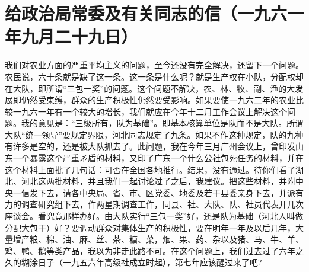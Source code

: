 \section{给政治局常委及有关同志的信（一九六一年九月二十九日）}


我们对农业方面的严重平均主义的问题，至今还没有完全解决，还留下一个问题。农民说，六十条就是缺了这一条。这一条是什么呢？就是生产权在小队，分配权却在大队，即所谓“三包一奖”的问题。这个问题不解决，农、林、牧、副、渔的大发展即仍然受束缚，群众的生产积极性仍然要受影响。如果要使一九六二年的农业比较一九六一年有一个较大的增长，我们就应在今年十二月工作会议上解决这个问题。我的意见是：“三级所有，队为基础”。即基本核算单位是队而不是大队。所谓大队“统一领导”要规定界限，河北同志规定了九条。如果不作这种规定，队的九种有许多是空的，还是被大队抓去了。此问题，我在今年三月广州会议上，曾印发山东一个暴露这个严重矛盾的材料，又印了广东一个什么公社包死任务的材料，并在这个材料上面批了几句话：可否在全国各地推行。结果，没有通过。待你们看了湖北、河北这两批材料，并且我们一起讨论过了之后，我建议。把这些材料，并附中央一信发下去，请各中央局、省、市、区党委、地委及若干县委亲身下去，并派有力的调查研究组下去，作两星期调查工作，同县、社、大队、队、社员代表开几次座谈会。看究竟那样办好。由大队实行“三包一奖”好，还是队为基础（河北人叫做分配大包干）好？要调动群众对集体生产的积极性，要在明年一年及以后几年，大量增产粮、棉、油、麻、丝、茶、糖、菜，烟、果、药、杂以及猪、马、牛、羊、鸡、鸭、鹅等类产品，我以为非走此路不可。在这个问题上，我们过去过了六年之久的糊涂日子（一九五六年高级社成立时起），第七年应该醒过来了吧?


